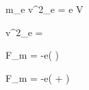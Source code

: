 
\large {} m_{e} v^{2}_{e} = e V 


\large v^{2}_{e} = 


\large \lvert F_{m} \rvert = \lvert -e( \times {}) \rvert 


\large \lvert F_{m} \rvert = \lvert -e(\vec{\varepsilon} +  \times {}) \rvert 
